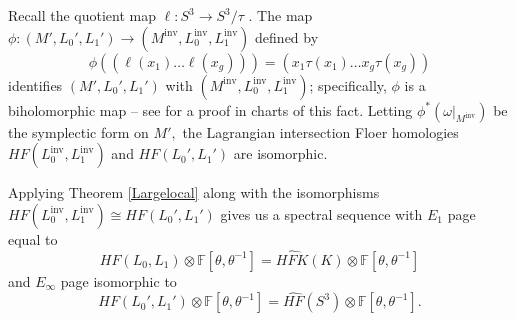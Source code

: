\documentclass[11pt]{amsart}
\theoremstyle{definition}
\theoremstyle{remark}
\def\F{\mathbb{F}}
\def\HF {\mathit{HF}}
\def\HFK {\mathit{HFK}}
\newcommand\HFKhat{\widehat{\HFK}}
\newcommand\HFhat{\widehat{\HF}}
\newcommand{\M}{M^{\operatorname{inv}}}
\newcommand{\Lo}{L_0^{\operatorname{inv}}}
\newcommand{\Li}{L_1^{\operatorname{inv}}}
\numberwithin{equation}{section}
\begin{document}
Recall the quotient map $\ell\colon S^3\to S^3/\tau$ . The map $\phi\colon (M', L_0', L_1')\to (\M, \Lo, \Li)$ defined by 
\begin{equation}
    \phi((\ell(x_1)\hdots \ell(x_g)))=(x_1\tau(x_1)\hdots x_g\tau(x_g))
\end{equation}
identifies $(M', L_0', L_1')$ with $(\M, \Lo, \Li)$; specifically, $\phi$ is a biholomorphic map -- see \cite[~Appendix 1]{Hendricks2012rank} for a proof in charts of this fact. Letting $\phi^*(\omega|_{\M})$ be the symplectic form on $M',$ the Lagrangian intersection Floer homologies $HF(\Lo, \Li)$ and $HF(L_0', L_1')$ are isomorphic. 

Applying Theorem \ref{Largelocal} along with the isomorphisms $HF(\Lo, \Li)\cong HF(L_0', L_1')$ gives us a spectral sequence with $E_1$ page equal to \[HF(L_0,L_1)\otimes \F[\theta,\theta^{-1}]=\HFKhat(K)\otimes\F[\theta,\theta^{-1}]\] and $E_\infty$ page isomorphic to \[HF(L_0', L_1')\otimes \F[\theta,\theta^{-1}]=\HFhat(S^3)\otimes \F[\theta,\theta^{-1}].\]
\end{document}
